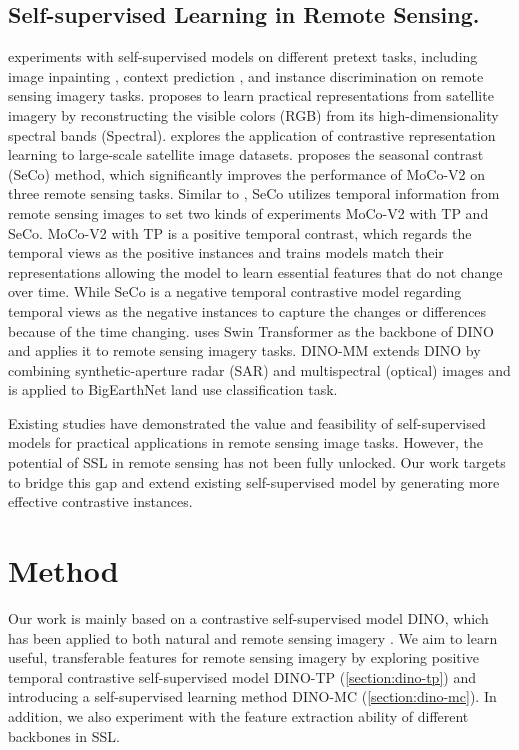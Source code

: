 \documentclass[10pt,twocolumn,letterpaper]{article}
\begin{document}
\subsection{Self-supervised Learning in Remote Sensing.} 
\cite{tao2020remote} experiments with self-supervised models on different pretext tasks, including image inpainting \cite{pathak2016context}, context prediction \cite{doersch2015unsupervised}, and instance discrimination \cite{wu2018unsupervised} on remote sensing imagery tasks. 
\cite{vincenzi2021color} proposes to learn practical representations from satellite imagery by reconstructing the visible colors (RGB) from its high-dimensionality spectral bands (Spectral).
\cite{ayush2021geography} explores the application of contrastive representation learning to large-scale satellite image datasets.
\cite{manas2021seasonal} proposes the seasonal contrast (SeCo) method, which significantly improves the performance of MoCo-V2 on three remote sensing tasks.
Similar to \cite{ayush2021geography}, SeCo utilizes temporal information from remote sensing images to set two kinds of experiments MoCo-V2 with TP and SeCo.
MoCo-V2 with TP is a positive temporal contrast, which regards the temporal views as the positive instances and trains models match their representations allowing the model to learn essential features that do not change over time.
While SeCo is a negative temporal contrastive model regarding temporal views as the negative instances to capture the changes or differences because of the time changing.
\cite{wang2022last} uses Swin Transformer as the backbone of DINO and applies it to remote sensing imagery tasks.
DINO-MM \cite{wang2022selfSAR} extends DINO by combining synthetic-aperture radar (SAR) and multispectral (optical) images and is applied to BigEarthNet land use classification task.

Existing studies have demonstrated the value and feasibility of self-supervised models for practical applications in remote sensing image tasks.
However, the potential of SSL in remote sensing has not been fully unlocked.
Our work targets to bridge this gap and extend existing self-supervised model by generating more effective contrastive instances.


\section{Method}
Our work is mainly based on a contrastive self-supervised model DINO, which has been applied to both natural and remote sensing imagery \cite{caron2021emerging,wang2022selfSAR,wang2022ssl4eo}.
We aim to learn useful, transferable features for remote sensing imagery by exploring positive temporal contrastive self-supervised model DINO-TP (\cref{section:dino-tp}) and introducing a self-supervised learning method DINO-MC (\cref{section:dino-mc}).
In addition, we also experiment with the feature extraction ability of different backbones in SSL.
\end{document}
